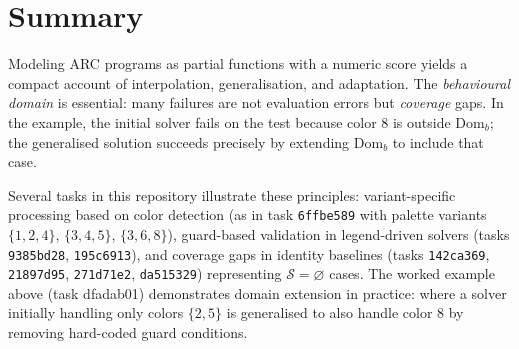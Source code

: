 \documentclass[11pt]{article}
\newcommand{\Domb}{\mathrm{Dom}_b}
\begin{document}
\section{Summary}

Modeling ARC programs as partial functions with a numeric score yields a compact account of interpolation, generalisation, and adaptation. The \emph{behavioural domain} is essential: many failures are not evaluation errors but \emph{coverage} gaps. In the example, the initial solver fails on the test because color $8$ is outside $\Domb$; the generalised solution succeeds precisely by extending $\Domb$ to include that case.

Several tasks in this repository illustrate these principles: variant-specific processing based on color detection (as in task \texttt{6ffbe589} with palette variants $\{1,2,4\}$, $\{3,4,5\}$, $\{3,6,8\}$), guard-based validation in legend-driven solvers (tasks \texttt{9385bd28}, \texttt{195c6913}), and coverage gaps in identity baselines (tasks \texttt{142ca369}, \texttt{21897d95}, \texttt{271d71e2}, \texttt{da515329}) representing $\mathcal{S}=\varnothing$ cases. The worked example above (task dfadab01) demonstrates domain extension in practice: where a solver initially handling only colors $\{2,5\}$ is generalised to also handle color $8$ by removing hard-coded guard conditions.
\end{document}
